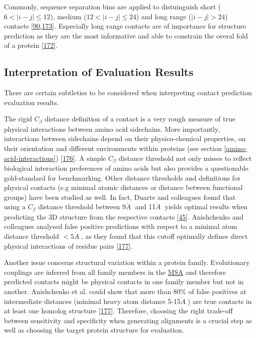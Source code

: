 \documentclass[11pt,a4paper,twoside]{book}
\newcommand{\Cb}{C_\beta}
\newcommand{\angstrom}{\mathring{A} \;}
\theoremstyle{definition}
\theoremstyle{definition}
\theoremstyle{remark}
\begin{document}
Commonly, sequence separation bins are applied to distuinguish short
(\(6 < |i-j| \le 12\)), medium (\(12 < |i-j| \le 24\)) and long range
(\(|i-j| > 24\)) contacts
{[}\protect\hyperlink{ref-Monastyrskyy2015}{90},\protect\hyperlink{ref-Monastyrskyy2014a}{173}{]}.
Especially long range contacts are of importance for structure
prediction as they are the most informative and able to constrain the
overal fold of a protein
{[}\protect\hyperlink{ref-Monastyrskyy2011}{172}{]}.

\subsection{Interpretation of Evaluation
Results}\label{interpretation-of-evaluation-results}

There are certain subtleties to be considered when interpreting contact
prediction evaluation results.

The rigid \(\Cb\) distance definition of a contact is a very rough
measure of true physical interactions between amino acid sidechains.
More importantly, interactions between sidechains depend on their
physico-chemical properties, on their orientation and different
environments within proteins (see section \ref{amino-acid-interactions})
{[}\protect\hyperlink{ref-Bettsa}{176}{]}. A simple \(\Cb\) distance
threshold not only misses to reflect biological interaction preferences
of amino acids but also provides a questionable gold-standard for
benchmarking. Other distance thresholds and definitions for physical
contacts (e.g minimal atomic distances or distance between functional
groups) have been studied as well. In fact, Duarte and colleagues found
that using a \(\Cb\) distance threshold between 9\(\angstrom\) and
11\(\angstrom\) yields optimal results when predicting the 3D structure
from the respective contacts
{[}\protect\hyperlink{ref-Duarte2010}{45}{]}. Anishchenko and colleagues
analysed false positive predictions with respect to a minimal atom
distance threshold \(< 5 \angstrom\), as they found that this cutoff
optimally defines direct physical interactions of residue pairs
{[}\protect\hyperlink{ref-Anishchenko2017}{177}{]}.

Another issue concerns structural variation within a protein family.
Evolutionary couplings are inferred from all family members in the
\protect\hyperlink{abbrev}{MSA} and therefore predicted contacts might
be physical contacts in one family member but not in another.
Anishchenko et al. could show that more than \(80\%\) of false positives
at intermediate distances (minimal heavy atom distance
5-15\(\angstrom\)) are true contacts in at least one homolog structure
{[}\protect\hyperlink{ref-Anishchenko2017}{177}{]}. Therefore, choosing
the right trade-off between sensitivity and specificity when generating
alignments is a crucial step as well as choosing the target protein
structure for evaluation.
\end{document}
